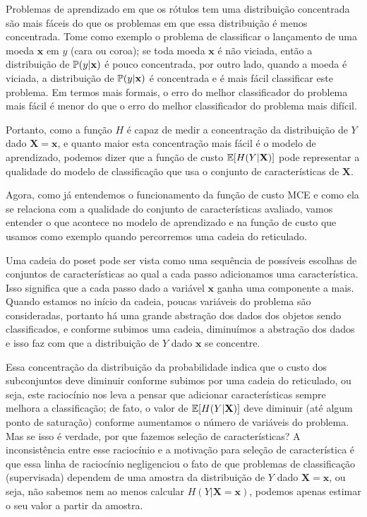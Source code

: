 Problemas de aprendizado em que os rótulos tem uma distribuição 
concentrada são mais fáceis do que os problemas em que essa distribuição
é menos concentrada. Tome como exemplo o problema de
classificar o lançamento de uma moeda $\mathbf{x}$ em $y$ (cara ou 
coroa); se toda moeda $\mathbf{x}$ é não viciada, então a distribuição
de $\mathbb{P} (y | \mathbf{x})$ é pouco concentrada, por outro lado,
quando a moeda é viciada, a distribuição de 
$\mathbb{P} (y | \mathbf{x})$ é concentrada e é mais fácil 
classificar este problema. Em termos mais formais, o erro do melhor 
classificador do problema mais fácil é menor do que o erro do melhor 
classificador do problema mais difícil.

Portanto, como a função $H$ é capaz de medir a concentração da 
distribuição de $Y$ dado $\mathbf{X = x}$, e quanto maior esta 
concentração mais fácil é o modelo de aprendizado, podemos dizer
que a função de custo $\mathbb{E}[H (Y | \mathbf{X})]$ pode 
representar a qualidade do modelo de classificação que usa o conjunto de
características de $\mathbf{X}$.

Agora, como já entendemos o funcionamento da função de custo
MCE e como ela se relaciona com a qualidade do conjunto de 
características avaliado, vamos entender o que acontece no modelo de 
aprendizado e na função de custo que usamos como exemplo quando 
percorremos uma cadeia do reticulado. 

Uma cadeia do poset pode ser vista como uma sequência de possíveis
escolhas de conjuntos de características ao qual a cada passo 
adicionamos uma característica. Isso significa que a cada passo dado
a variável $\mathbf{x}$ ganha uma componente a mais. Quando estamos no 
início da cadeia, poucas variáveis do problema são consideradas, 
portanto há uma grande abstração dos dados dos objetos sendo 
classificados, e conforme subimos uma cadeia, diminuímos a abstração dos
dados e isso faz com que a distribuição de $Y$ dado $\mathbf{x}$ se 
concentre.

Essa concentração da distribuição da probabilidade indica que o custo 
dos subconjuntos deve diminuir conforme subimos por uma cadeia do 
reticulado, ou seja, este raciocínio nos leva a pensar que adicionar 
características sempre melhora a classificação; de fato, o valor de
$\mathbb{E}[H (Y | \mathbf{X})]$ deve diminuir (até algum ponto 
de saturação) conforme aumentamos o número de variáveis do problema. 
Mas se isso é verdade, por que fazemos seleção de características? A 
inconsistência entre esse raciocínio e a motivação para seleção de 
característica é que essa linha de raciocínio negligenciou o fato de que 
problemas de classificação (supervisada) dependem de uma amostra da 
distribuição de $Y$ dado $\mathbf{X = x}$, ou seja, não sabemos nem ao 
menos calcular $H (Y | \mathbf{X = x})$, podemos apenas estimar o seu 
valor a partir da amostra.

